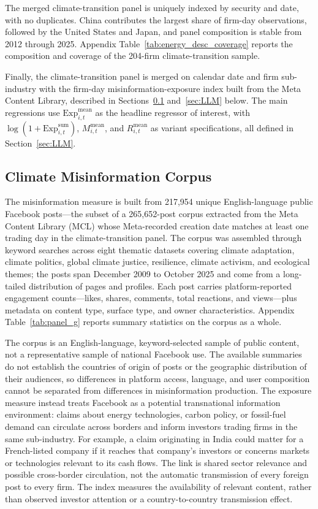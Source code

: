\documentclass{article}
\theoremstyle{plain}
\begin{document}
The merged climate-transition panel is uniquely indexed by security and date, with no duplicates. China contributes the largest share of firm-day observations, followed by the United States and Japan, and panel composition is stable from 2012 through 2025. Appendix Table~\ref{tab:energy_desc_coverage} reports the composition and coverage of the 204-firm climate-transition sample.

Finally, the climate-transition panel is merged on calendar date and firm sub-industry with the firm-day misinformation-exposure index built from the Meta Content Library, described in Sections~\ref{sec:data_misinfo} and~\ref{sec:LLM} below. The main regressions use $\mathrm{Exp}^{\text{mean}}_{i,t}$ as the headline regressor of interest, with $\log(1+\mathrm{Exp}^{\text{sum}}_{i,t})$, $M^{\text{mean}}_{i,t}$, and $R^{\text{mean}}_{i,t}$ as variant specifications, all defined in Section~\ref{sec:LLM}.

\subsection{Climate Misinformation Corpus}
\label{sec:data_misinfo}

The misinformation measure is built from 217,954 unique English-language public Facebook posts---the subset of a 265,652-post corpus extracted from the Meta Content Library (MCL) whose Meta-recorded creation date matches at least one trading day in the climate-transition panel. The corpus was assembled through keyword searches across eight thematic datasets covering climate adaptation, climate politics, global climate justice, resilience, climate activism, and ecological themes; the posts span December 2009 to October 2025 and come from a long-tailed distribution of pages and profiles. Each post carries platform-reported engagement counts---likes, shares, comments, total reactions, and views---plus metadata on content type, surface type, and owner characteristics. Appendix Table~\ref{tab:panel_g} reports summary statistics on the corpus as a whole.

The corpus is an English-language, keyword-selected sample of public content, not a representative sample of national Facebook use. The available summaries do not establish the countries of origin of posts or the geographic distribution of their audiences, so differences in platform access, language, and user composition cannot be separated from differences in misinformation production. The exposure measure instead treats Facebook as a potential transnational information environment: claims about energy technologies, carbon policy, or fossil-fuel demand can circulate across borders and inform investors trading firms in the same sub-industry. For example, a claim originating in India could matter for a French-listed company if it reaches that company's investors or concerns markets or technologies relevant to its cash flows. The link is shared sector relevance and possible cross-border circulation, not the automatic transmission of every foreign post to every firm. The index measures the availability of relevant content, rather than observed investor attention or a country-to-country transmission effect.
\end{document}
